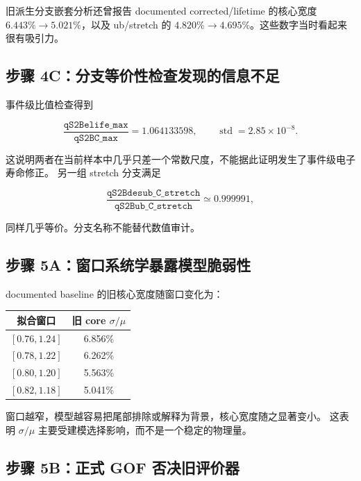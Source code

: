 \documentclass[UTF8,12pt,a4paper,oneside,fontset=none]{ctexart}
\numberwithin{equation}{section}
\begin{document}
旧派生分支嵌套分析还曾报告 documented corrected/lifetime 的核心宽度
\(6.443\%\rightarrow5.021\%\)，以及 ub/stretch 的
\(4.820\%\rightarrow4.695\%\)。这些数字当时看起来很有吸引力。

\subsection{步骤 4C：分支等价性检查发现的信息不足}

事件级比值检查得到

\begin{equation}
\frac{\texttt{qS2Belife\_max}}{\texttt{qS2BC\_max}}
=1.064133598,
\qquad
\operatorname{std}=2.85\times10^{-8}.
\label{eq:branch-ratio-lifetime}
\end{equation}

这说明两者在当前样本中几乎只差一个常数尺度，不能据此证明发生了事件级电子寿命修正。
另一组 stretch 分支满足

\begin{equation}
\frac{\texttt{qS2Bdesub\_C\_stretch}}
{\texttt{qS2Bub\_C\_stretch}}
\simeq0.999991,
\label{eq:branch-ratio-stretch}
\end{equation}

同样几乎等价。分支名称不能替代数值审计。

\subsection{步骤 5A：窗口系统学暴露模型脆弱性}

documented baseline 的旧核心宽度随窗口变化为：

\begin{center}
\begin{tabular}{cc}
\toprule
拟合窗口 & 旧 core \(\sigma/\mu\) \\
\midrule
\([0.76,1.24]\) & 6.856\% \\
\([0.78,1.22]\) & 6.262\% \\
\([0.80,1.20]\) & 5.563\% \\
\([0.82,1.18]\) & 5.041\% \\
\bottomrule
\end{tabular}
\end{center}

窗口越窄，模型越容易把尾部排除或解释为背景，核心宽度随之显著变小。
这表明 \(\sigma/\mu\) 主要受建模选择影响，而不是一个稳定的物理量。

\subsection{步骤 5B：正式 GOF 否决旧评价器}
\end{document}
